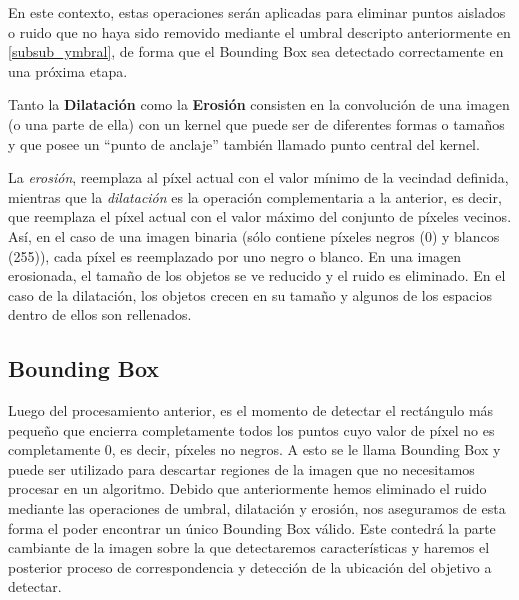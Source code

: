 \documentclass[a4paper,11pt,spanish]{article}
\begin{document}
En este contexto, estas operaciones serán aplicadas para eliminar puntos aislados o ruido que no haya sido removido mediante el umbral descripto anteriormente en \ref{subsub_ymbral}, de forma que el Bounding Box sea detectado correctamente en una próxima etapa.

Tanto la \textbf{Dilatación} como la \textbf{Erosión} consisten en la convolución de una imagen (o una parte de ella) con un kernel que puede ser de diferentes formas o tamaños y que posee un ``punto de anclaje'' también llamado punto central del kernel.

La \emph{erosión}, reemplaza al píxel actual con el valor mínimo de la vecindad definida, mientras que la \emph{dilatación} es la operación complementaria a la anterior, es decir, que reemplaza el píxel actual con el valor máximo del conjunto de píxeles vecinos. Así, en el caso de una imagen binaria (sólo contiene píxeles negros (0) y blancos (255)), cada píxel es reemplazado por uno negro o blanco. En una imagen erosionada, el tamaño de los objetos se ve reducido y el ruido es eliminado. En el caso de la dilatación, los objetos crecen en su tamaño y algunos de los espacios dentro de ellos son rellenados.

\subsection{Bounding Box}
Luego del procesamiento anterior, es el momento de detectar el rectángulo más pequeño que encierra completamente todos los puntos cuyo valor de píxel no es completamente 0, es decir, píxeles no negros. A esto se le llama Bounding Box y puede ser utilizado para descartar regiones de la imagen que no necesitamos procesar en un algoritmo. Debido que anteriormente hemos eliminado el ruido mediante las operaciones de umbral, dilatación y erosión, nos aseguramos de esta forma el poder encontrar un único Bounding Box válido. Este contedrá la parte cambiante de la imagen sobre la que detectaremos características y haremos el posterior proceso de correspondencia y detección de la ubicación del objetivo a detectar.
\end{document}
